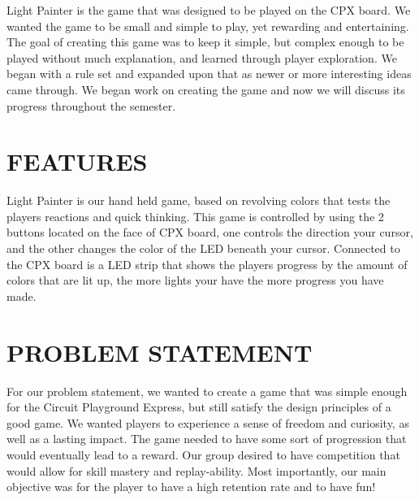 \documentclass[12pt]{article}
\begin{document}
Light Painter is the game that was designed to be played on the CPX board. We wanted the game to be small and simple to play, yet rewarding and entertaining. The goal of creating this game was to keep it simple, but complex enough to be played without much explanation, and learned through player exploration. We began with a rule set and expanded upon that as newer or more interesting ideas came through. We began work on creating the game and now we will discuss its progress throughout the semester. 

\section{FEATURES}

Light Painter is our hand held game, based on revolving colors that tests the players reactions and quick thinking. This game is controlled by using the 2 buttons located on the face of CPX board, one controls the direction your cursor, and the other changes the color of the LED beneath your cursor. Connected to the CPX board is a LED strip that shows the players progress by the amount of colors that are lit up, the more lights your have the more progress you have made.

 

\section{PROBLEM STATEMENT}

For our problem statement, we wanted to create a game that was simple enough for the Circuit Playground Express, but still satisfy the design principles of a good game. We wanted players to experience a sense of freedom and curiosity, as well as a lasting impact. The game needed to have some sort of progression that would eventually lead to a reward. Our group desired to have competition that would allow for skill mastery and replay-ability. Most importantly, our main objective was for the player to have a high retention rate and to have fun!
\end{document}
